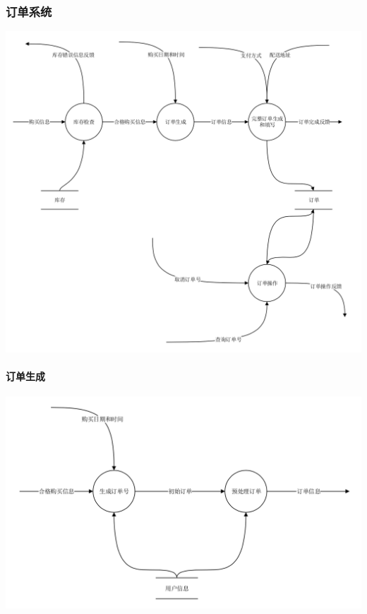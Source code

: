 \subsubsection{订单系统}
\begin{center}
    \includegraphics[width=1\linewidth]{img/3.png}
\end{center}
\paragraph{订单生成}
\begin{center}
    \includegraphics[width=1\linewidth]{img/3.2.png}
\end{center}
